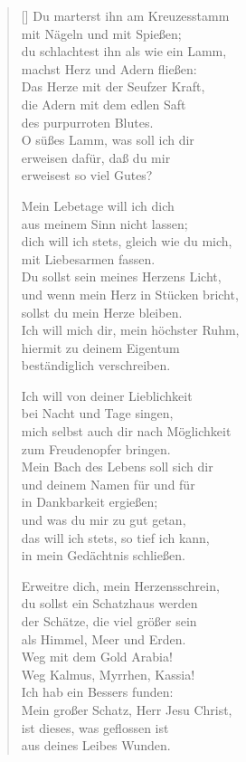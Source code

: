 \begin{multicols}{2}
\begin{verse}[\versewidth]
 Du marterst ihn am Kreuzesstamm\\
mit Nägeln und mit Spießen;\\
du schlachtest ihn als wie ein Lamm,\\
machst Herz und Adern fließen:\\
Das Herze mit der Seufzer Kraft,\\
die Adern mit dem edlen Saft\\
des purpurroten Blutes.\\
O süßes Lamm, was soll ich dir\\
erweisen dafür, daß du mir\\
erweisest so viel Gutes?
 
 Mein Lebetage will ich dich\\
aus meinem Sinn nicht lassen;\\
dich will ich stets, gleich wie du mich,\\
mit Liebesarmen fassen.\\
Du sollst sein meines Herzens Licht,\\
und wenn mein Herz in Stücken bricht,\\
sollst du mein Herze bleiben.\\
Ich will mich dir, mein höchster Ruhm,\\
hiermit zu deinem Eigentum\\
beständiglich verschreiben.
 
 Ich will von deiner Lieblichkeit\\
bei Nacht und Tage singen,\\
mich selbst auch dir nach Möglichkeit\\
zum Freudenopfer bringen.\\
Mein Bach des Lebens soll sich dir\\
und deinem Namen für und für\\
in Dankbarkeit ergießen;\\
und was du mir zu gut getan,\\
das will ich stets, so tief ich kann,\\
in mein Gedächtnis schließen.
 
 Erweitre dich, mein Herzensschrein,\\
du sollst ein Schatzhaus werden\\
der Schätze, die viel größer sein\\
als Himmel, Meer und Erden.\\
Weg mit dem Gold Arabia!\\
Weg Kalmus, Myrrhen, Kassia!\\
Ich hab ein Bessers funden:\\
Mein großer Schatz, Herr Jesu Christ,\\
ist dieses, was geflossen ist\\
aus deines Leibes Wunden.
 

\end{verse}
\end{multicols}
